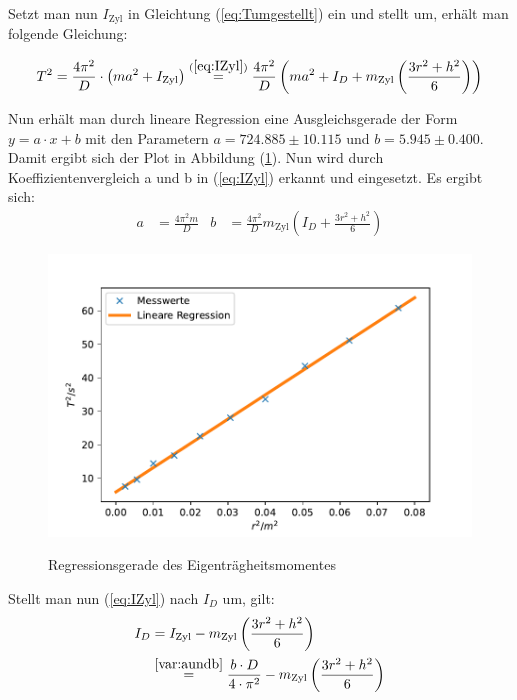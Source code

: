 Setzt man nun $I_{\text{Zyl}}$ in Gleichtung (\ref{eq:Tumgestellt}) ein und stellt um, erhält man folgende Gleichung:

\begin{equation}
  T^2 = \frac{4 \pi^2}{D} \cdot \left( ma^2 + I_{\text{Zyl}} \right) \stackrel{(\ref{eq:IZyl})}{=} 
  \frac{4 \pi^2}{D} \left( ma^2 + I_{D} + m_{\text{Zyl}}  \left( \frac{3 r^2 + h^2}{6} \right) \right)
\end{equation}

Nun erhält man durch lineare Regression eine Ausgleichsgerade der Form $y = a \cdot x + b$ mit den Parametern
$a = 724.885 ± 10.115$ und $b = 5.945 ± 0.400$. Damit ergibt sich der Plot in Abbildung (\ref{fig:Lineareregression}).
Nun wird durch Koeffizientenvergleich a und b in (\ref{eq:IZyl}) erkannt und eingesetzt.
Es ergibt sich:
\begin{align} \label{var:aundb}
  a & = \frac{4 \pi^2 m}{D} & b & = \frac{4 \pi^2}{D} m_{\text{Zyl}}  \left(I_{D} + \frac{3 r^2 + h^2}{6} \right)
\end{align}

\begin{figure}[H]
  \caption{Regressionsgerade des Eigenträgheitsmomentes}
  \centering
  \includegraphics{pictures/Lineare Regression.pdf}
  \label{fig:Lineareregression}
\end{figure}

Stellt man nun (\ref{eq:IZyl}) nach $I_{D}$ um, gilt:
\begin{equation} \label{eq:idgauß}  %
  \begin{split}
  I_{D} {} &= I_{\text{Zyl}} - m_{\text{Zyl}}  \left( \frac{3 r^2 + h^2}{6} \right) \\
    &\stackrel{\ref{var:aundb}}{=} \frac{b \cdot D}{4 \cdot \pi^2} - m_{\text{Zyl}}  \left( \frac{3 r^2 + h^2}{6} \right)
  \end{split}
\end{equation}


